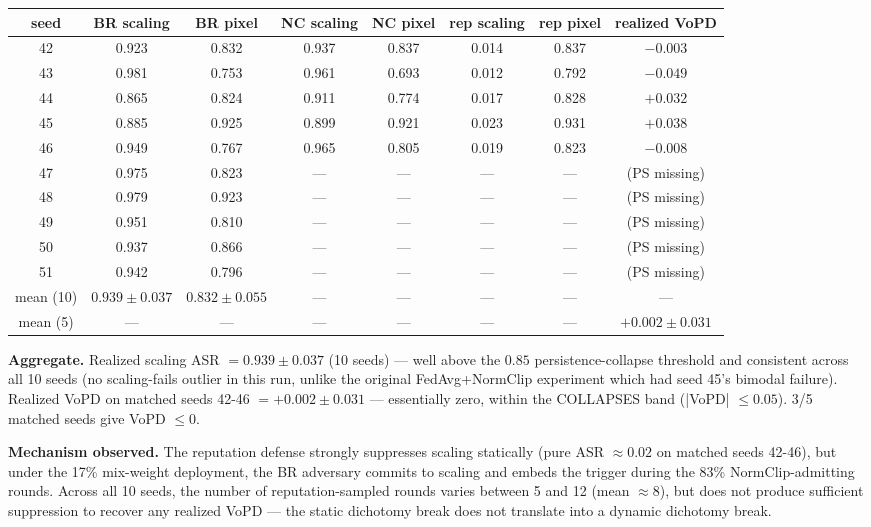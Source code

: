 \documentclass{article}
\begin{document}
\begin{center}\small
\begin{tabular}{c|cc|cc|cc|c}
\toprule
seed & BR scaling & BR pixel & NC scaling & NC pixel & rep scaling & rep pixel & realized VoPD \\
\midrule
42 & 0.923 & 0.832 & 0.937 & 0.837 & 0.014 & 0.837 & $-0.003$ \\
43 & 0.981 & 0.753 & 0.961 & 0.693 & 0.012 & 0.792 & $-0.049$ \\
44 & 0.865 & 0.824 & 0.911 & 0.774 & 0.017 & 0.828 & $+0.032$ \\
45 & 0.885 & 0.925 & 0.899 & 0.921 & 0.023 & 0.931 & $+0.038$ \\
46 & 0.949 & 0.767 & 0.965 & 0.805 & 0.019 & 0.823 & $-0.008$ \\
\midrule
47 & 0.975 & 0.823 & --- & --- & --- & --- & (PS missing) \\
48 & 0.979 & 0.923 & --- & --- & --- & --- & (PS missing) \\
49 & 0.951 & 0.810 & --- & --- & --- & --- & (PS missing) \\
50 & 0.937 & 0.866 & --- & --- & --- & --- & (PS missing) \\
51 & 0.942 & 0.796 & --- & --- & --- & --- & (PS missing) \\
\midrule
mean (10) & $0.939 \pm 0.037$ & $0.832 \pm 0.055$ & --- & --- & --- & --- & --- \\
mean (5)  & --- & --- & --- & --- & --- & --- & $+0.002 \pm 0.031$ \\
\bottomrule
\end{tabular}
\end{center}

\textbf{Aggregate.} Realized scaling ASR $= 0.939 \pm 0.037$ (10 seeds) --- well above the $0.85$ persistence-collapse threshold and consistent across all 10 seeds (no scaling-fails outlier in this run, unlike the original FedAvg+NormClip experiment which had seed 45's bimodal failure). Realized VoPD on matched seeds 42-46 $= +0.002 \pm 0.031$ --- essentially zero, within the COLLAPSES band (|VoPD| $\leq 0.05$). 3/5 matched seeds give VoPD $\leq 0$.

\textbf{Mechanism observed.} The reputation defense strongly suppresses scaling statically (pure ASR $\approx 0.02$ on matched seeds 42-46), but under the 17\% mix-weight deployment, the BR adversary commits to scaling and embeds the trigger during the 83\% NormClip-admitting rounds. Across all 10 seeds, the number of reputation-sampled rounds varies between 5 and 12 (mean $\approx 8$), but does not produce sufficient suppression to recover any realized VoPD --- the static dichotomy break does not translate into a dynamic dichotomy break.
\end{document}
